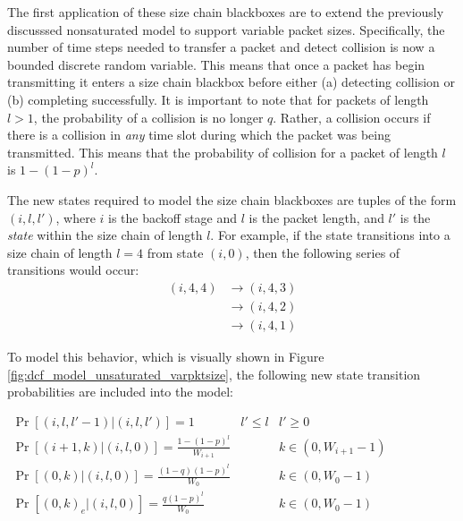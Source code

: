 \documentclass{llncs}
\begin{document}
The first application of these size chain blackboxes are to extend the previously discusssed nonsaturated model to support variable packet sizes. Specifically, the number of time steps needed to transfer a packet and detect collision is now a bounded discrete random variable. This means that once a packet has begin transmitting it enters a size chain blackbox before either (a) detecting collision or (b) completing successfully. It is important to note that for packets of length $l > 1$, the probability of a collision is no longer $q$. Rather, a collision occurs if there is a collision in \emph{any} time slot during which the packet was being transmitted. This means that the probability of collision for a packet of length $l$ is $1 - (1 - p)^l$. 

The new states required to model the size chain blackboxes are tuples of the form $(i, l, l')$, where $i$ is the backoff stage and $l$ is the packet length, and $l'$ is the \emph{state} within the size chain of length $l$. For example, if the state transitions into a size chain of length $l = 4$ from state $(i, 0)$, then the following series of transitions would occur: 
\begin{align*}
(i, 4, 4) & \to (i, 4, 3) \\
& \to (i, 4, 2) \\
& \to (i, 4, 1)
\end{align*}

To model this behavior, which is visually shown in Figure \ref{fig:dcf_model_unsaturated_varpktsize}, the following new state transition probabilities are included into the model:

\begin{center}
\begin{math}
\boxed{
\begin{array}{lll}
\Pr[(i,l,l'-1) | (i,l,l')] = 1 & l' \leq l & l' \geq 0 \\
\Pr[(i+1,k) | (i,l,0)] = \frac{1 - (1 - p)^l}{W_{i+1}} & ~ & k \in (0, W_{i+1} - 1) \\
\Pr[(0,k) | (i,l,0)] = \frac{(1 - q)(1 - p)^l}{W_0} & ~ & k \in (0, W_{0} - 1) \\
\Pr[(0,k)_e | (i,l,0)] = \frac{q(1 - p)^l}{W_0} & ~ & k \in (0, W_{0} - 1) \\
\end{array}
}
\end{math}
\end{center}
\end{document}
